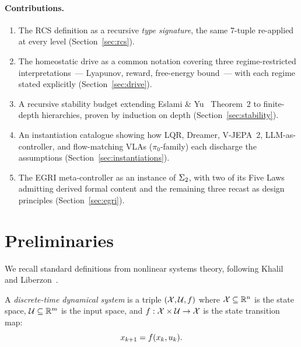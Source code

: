 \documentclass[11pt,a4paper]{article}
\begin{document}
\paragraph{Contributions.}
\begin{enumerate}
  \item The RCS definition as a recursive \emph{type signature}, the
        same 7-tuple re-applied at every level
        (Section~\ref{sec:rcs}).
  \item The homeostatic drive as a common notation covering three
        regime-restricted interpretations~--- Lyapunov, reward,
        free-energy bound~--- with each regime stated explicitly
        (Section~\ref{sec:drive}).
  \item A recursive stability budget extending Eslami \&
        Yu~\cite{eslami2026control} Theorem~2 to finite-depth
        hierarchies, proven by induction on depth
        (Section~\ref{sec:stability}).
  \item An instantiation catalogue showing how LQR, Dreamer, V-JEPA~2,
        LLM-as-controller, and flow-matching VLAs ($\pi_0$-family) each
        discharge the assumptions
        (Section~\ref{sec:instantiations}).
  \item The EGRI meta-controller as an instance of $\Sigma_2$, with two
        of its Five Laws admitting derived formal content and the
        remaining three recast as design principles
        (Section~\ref{sec:egri}).
\end{enumerate}


\section{Preliminaries}

We recall standard definitions from nonlinear systems theory, following
Khalil~\cite{khalil2002nonlinear} and Liberzon~\cite{liberzon2003switching}.

\begin{definition}
A \emph{discrete-time dynamical system} is a triple $(\mathcal{X}, \mathcal{U}, f)$ where
$\mathcal{X} \subseteq \mathbb{R}^n$ is the state space, $\mathcal{U} \subseteq \mathbb{R}^m$ is the
input space, and $f : \mathcal{X} \times \mathcal{U} \to \mathcal{X}$ is the state transition map:
\begin{equation}
  x_{k+1} = f(x_k, u_k).
\end{equation}
\end{definition}
\end{document}

